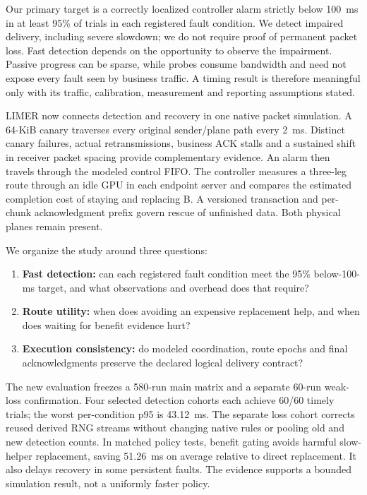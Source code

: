 \documentclass[sigconf]{acmart}
\begin{document}
Our primary target is a correctly localized controller alarm strictly
below 100~ms in at least 95\% of trials in each registered fault condition.
We detect impaired delivery, including severe slowdown; we do not require
proof of permanent packet loss. Fast detection depends on the opportunity
to observe the impairment. Passive progress can be sparse, while probes
consume bandwidth and need not expose every fault seen by business traffic.
A timing result is therefore meaningful only with its traffic, calibration,
measurement and reporting assumptions stated.

LIMER now connects detection and recovery in one native packet simulation.
A 64-KiB canary traverses every original sender/plane path every 2~ms.
Distinct canary failures, actual retransmissions, business ACK stalls and
a sustained shift in receiver packet spacing provide complementary evidence.
An alarm then travels through the modeled control FIFO. The controller
measures a three-leg route through an idle GPU in each endpoint server and
compares the estimated completion cost of staying and replacing B.
A versioned transaction and per-chunk acknowledgment prefix govern rescue
of unfinished data. Both physical planes remain present.

We organize the study around three questions:
\begin{enumerate}
\item \textbf{Fast detection:} can each registered fault condition meet the
95\% below-100-ms target, and what observations and overhead does that require?
\item \textbf{Route utility:} when does avoiding an expensive replacement
help, and when does waiting for benefit evidence hurt?
\item \textbf{Execution consistency:} do modeled coordination, route epochs
and final acknowledgments preserve the declared logical delivery contract?
\end{enumerate}

The new evaluation freezes a 580-run main matrix and a separate 60-run
weak-loss confirmation. Four selected detection cohorts each achieve
60/60 timely trials; the worst per-condition p95 is 43.12~ms. The separate
loss cohort corrects reused derived RNG streams without changing native
rules or pooling old and new detection counts. In matched policy tests,
benefit gating avoids harmful slow-helper replacement, saving 51.26~ms on
average relative to direct replacement. It also delays recovery in some
persistent faults. The evidence supports a bounded simulation result,
not a uniformly faster policy.
\end{document}
